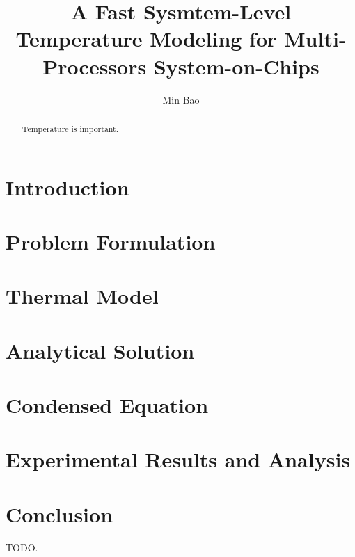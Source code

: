 \documentclass[conference]{IEEEtran}
\title{A Fast Sysmtem-Level Temperature Modeling for Multi-Processors System-on-Chips}
\author{Min Bao}
\begin{document}
  \maketitle

  \begin{abstract}
    Temperature is important.
  \end{abstract}

  \section{Introduction}
  

  \section{Problem Formulation}
  

  \section{Thermal Model}
  

  \section{Analytical Solution}
  

  \section{Condensed Equation}
  

  \section{Experimental Results and Analysis} \label{sec:experimental-results}
  

  \section{Conclusion}
  TODO.

  
\end{document}
